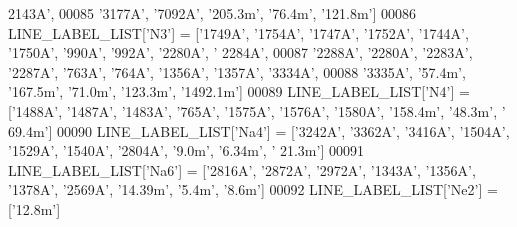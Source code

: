 \begin{DoxyCode}
{{{      2143A'}, 
00085                          \textcolor{stringliteral}{'3177A'}, \textcolor{stringliteral}{'7092A'}, \textcolor{stringliteral}{'205.3m'}, \textcolor{stringliteral}{'76.4m'}, \textcolor{stringliteral}{'121.8m'}]
00086 LINE\_LABEL\_LIST[\textcolor{stringliteral}{'N3'}] = [\textcolor{stringliteral}{'1749A'}, \textcolor{stringliteral}{'1754A'}, \textcolor{stringliteral}{'1747A'}, \textcolor{stringliteral}{'1752A'}, \textcolor{stringliteral}{'1744A'}, \textcolor{stringliteral}{'1750A'}, \textcolor{stringliteral}{'990A'}, \textcolor{stringliteral}{'992A'}, \textcolor{stringliteral}{'2280A'}, \textcolor{stringliteral}{'
      2284A'}, 
00087                          \textcolor{stringliteral}{'2288A'}, \textcolor{stringliteral}{'2280A'}, \textcolor{stringliteral}{'2283A'}, \textcolor{stringliteral}{'2287A'}, \textcolor{stringliteral}{'763A'}, \textcolor{stringliteral}{'764A'}, \textcolor{stringliteral}{'1356A'}, \textcolor{stringliteral}{'1357A'}, \textcolor{stringliteral}{'3334A'}, 
00088                          \textcolor{stringliteral}{'3335A'}, \textcolor{stringliteral}{'57.4m'}, \textcolor{stringliteral}{'167.5m'}, \textcolor{stringliteral}{'71.0m'}, \textcolor{stringliteral}{'123.3m'}, \textcolor{stringliteral}{'1492.1m'}]
00089 LINE\_LABEL\_LIST[\textcolor{stringliteral}{'N4'}] = [\textcolor{stringliteral}{'1488A'}, \textcolor{stringliteral}{'1487A'}, \textcolor{stringliteral}{'1483A'}, \textcolor{stringliteral}{'765A'}, \textcolor{stringliteral}{'1575A'}, \textcolor{stringliteral}{'1576A'}, \textcolor{stringliteral}{'1580A'}, \textcolor{stringliteral}{'158.4m'}, \textcolor{stringliteral}{'48.3m'}, \textcolor{stringliteral}{'
      69.4m'}]
00090 LINE\_LABEL\_LIST[\textcolor{stringliteral}{'Na4'}] = [\textcolor{stringliteral}{'3242A'}, \textcolor{stringliteral}{'3362A'}, \textcolor{stringliteral}{'3416A'}, \textcolor{stringliteral}{'1504A'}, \textcolor{stringliteral}{'1529A'}, \textcolor{stringliteral}{'1540A'}, \textcolor{stringliteral}{'2804A'}, \textcolor{stringliteral}{'9.0m'}, \textcolor{stringliteral}{'6.34m'}, \textcolor{stringliteral}{'
      21.3m'}]
00091 LINE\_LABEL\_LIST[\textcolor{stringliteral}{'Na6'}] = [\textcolor{stringliteral}{'2816A'}, \textcolor{stringliteral}{'2872A'}, \textcolor{stringliteral}{'2972A'}, \textcolor{stringliteral}{'1343A'}, \textcolor{stringliteral}{'1356A'}, \textcolor{stringliteral}{'1378A'}, \textcolor{stringliteral}{'2569A'}, \textcolor{stringliteral}{'14.39m'}, \textcolor{stringliteral}{'5.4m'}, \textcolor{stringliteral}{
      '8.6m'}]
00092 LINE\_LABEL\_LIST[\textcolor{stringliteral}{'Ne2'}] = [\textcolor{stringliteral}{'12.8m'}]
}}
\end{DoxyCode}

